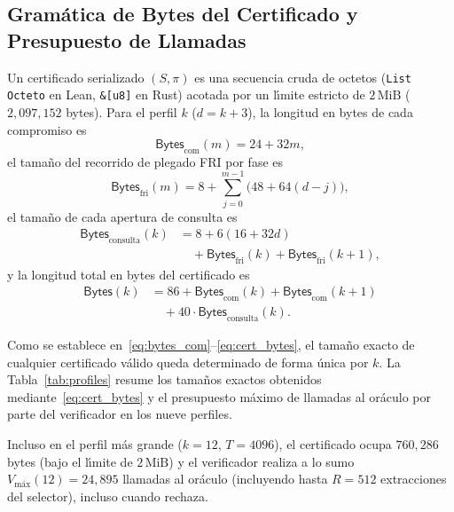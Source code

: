 \documentclass[conference]{IEEEtran}
\theoremstyle{definition}
\begin{document}
\subsection{Gram\'{a}tica de Bytes del Certificado y Presupuesto de Llamadas}
Un certificado serializado $(S, \pi)$ es una secuencia cruda de octetos (\texttt{List Octeto} en Lean, \texttt{\&[u8]} en Rust) acotada por un l\'{\i}mite estricto de $2\,\text{MiB}$ ($2{,}097{,}152$ bytes). Para el perfil $k$ ($d = k + 3$), la longitud en bytes de cada compromiso es
\begin{equation}
\label{eq:bytes_com}
\mathsf{Bytes}_{\text{com}}(m) = 24 + 32m,
\end{equation}
el tama\~{n}o del recorrido de plegado FRI por fase es
\begin{equation}
\label{eq:bytes_fri}
\mathsf{Bytes}_{\text{fri}}(m) = 8 + \sum_{j=0}^{m-1} \bigl(48 + 64(d - j)\bigr),
\end{equation}
el tama\~{n}o de cada apertura de consulta es
\begin{equation}
\label{eq:bytes_query}
\begin{aligned}
\mathsf{Bytes}_{\text{consulta}}(k) &= 8 + 6(16 + 32d) \\
&\quad + \mathsf{Bytes}_{\text{fri}}(k) + \mathsf{Bytes}_{\text{fri}}(k+1),
\end{aligned}
\end{equation}
y la longitud total en bytes del certificado es
\begin{equation}
\label{eq:cert_bytes}
\begin{aligned}
\mathsf{Bytes}(k) &= 86 + \mathsf{Bytes}_{\text{com}}(k) + \mathsf{Bytes}_{\text{com}}(k+1) \\
&\quad + 40 \cdot \mathsf{Bytes}_{\text{consulta}}(k).
\end{aligned}
\end{equation}

Como se establece en~\eqref{eq:bytes_com}--\eqref{eq:cert_bytes}, el tama\~{n}o exacto de cualquier certificado v\'{a}lido queda determinado de forma \'{u}nica por $k$. La Tabla~\ref{tab:profiles} resume los tama\~{n}os exactos obtenidos mediante~\eqref{eq:cert_bytes} y el presupuesto m\'{a}ximo de llamadas al or\'{a}culo por parte del verificador en los nueve perfiles.

Incluso en el perfil m\'{a}s grande ($k = 12$, $T = 4096$), el certificado ocupa $760{,}286$ bytes (bajo el l\'{\i}mite de $2\,\text{MiB}$) y el verificador realiza a lo sumo $V_{\text{m\'{a}x}}(12) = 24{,}895$ llamadas al or\'{a}culo (incluyendo hasta $R = 512$ extracciones del selector), incluso cuando rechaza.
\end{document}
